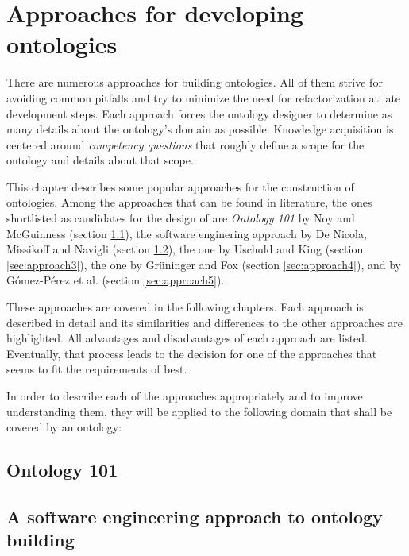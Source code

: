 \chapter{Approaches for developing ontologies}
\label{ch:development_approaches}

There are numerous approaches for building ontologies. All of them strive for avoiding common pitfalls and try to minimize the need for refactorization at late development steps. Each approach forces the ontology designer to determine as many details about the ontology's domain as possible. Knowledge acquisition is centered around \emph{competency questions} that roughly define a scope for the ontology and details about that scope. 

This chapter describes some popular approaches for the construction of ontologies. Among the approaches that can be found in literature, the ones shortlisted as candidates for the design of \thinkhomeweather are
\emph{Ontology 101} by Noy and McGuinness \cite{Ontology101} (section \ref{sec:approach1}),
the software enginering approach by De Nicola, Missikoff and Navigli \cite{SoftwareEngineeringOntology} (section \ref{sec:approach2}),
the one by Uschuld and King \cite{UscholdKing} (section \ref{sec:approach3}),
the one by Grüninger and Fox \cite{GruningerFox} (section \ref{sec:approach4}),
and \methontology by Gómez-Pérez et al. \cite{Methontology} (section \ref{sec:approach5}).

These approaches are covered in the following chapters. Each approach is described in detail and its similarities and differences to the other approaches are highlighted. All advantages and disadvantages of each approach are listed. Eventually, that process leads to the decision for one of the approaches that seems to fit the requirements of \thinkhomeweather best.

In order to describe each of the approaches appropriately and to improve understanding them, they will be applied to the following domain that shall be covered by an ontology:





\section{Ontology 101}
\label{sec:approach1}

\section{A software engineering approach to ontology building}
\label{sec:approach2}

